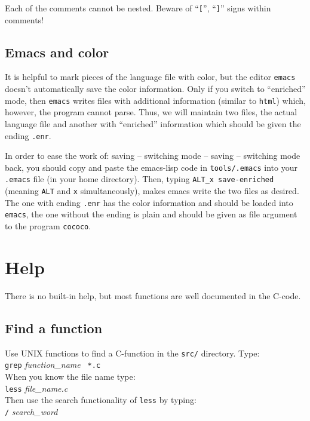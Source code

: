 \documentclass[12pt]{article}
\begin{document}
 Each of the comments cannot be nested.
 Beware of ``\texttt{[}'', ``\texttt{]}'' signs within comments!


\subsection{Emacs and {\color{blue}c\color{red}o\color{green}l\color{magenta}o\color{mygreen}r}}
 It is helpful to mark pieces of the language file with color,
 but the editor \texttt{emacs} doesn't automatically save the color information.
 Only if you switch to ``enriched'' mode, then \texttt{emacs} writes files with additional information (similar to \texttt{html})
 which, however, the program cannot parse.
 Thus, we will maintain two files, the actual language file
 and another with ``enriched'' information which should be given the ending \texttt{.enr}.

 In order to ease the work of: saving -- switching mode -- saving -- switching mode back,
 you should copy and paste the emacs-lisp code in \texttt{tools/.emacs}
 into your \texttt{.emacs} file (in your home directory).
 Then, typing \texttt{ALT\_x save-enriched} (meaning \texttt{ALT} and \texttt{x} simultaneously),
 makes emacs write the two files as desired.
 The one with ending \texttt{.enr} has the color information and should be loaded into \texttt{emacs},
 the one without the ending is plain and should be given as file argument to the program \texttt{cococo}.


\section{Help}
 There is no built-in help, but most functions are well documented in the C-code.

 \subsection{Find a function}
 Use UNIX functions to find a C-function in the \texttt{src/} directory. Type:\\
 \hspace*{11mm} \texttt{grep} {\sl function\_name} \texttt{ *.c} \\
 When you know the file name type: \\
 \hspace*{11mm} \texttt{less} {\sl file\_name.c} \\
 Then use the search functionality of \texttt{less} by typing: \\
 \hspace*{11mm} \texttt{/} {\sl search\_word}
\end{document}
